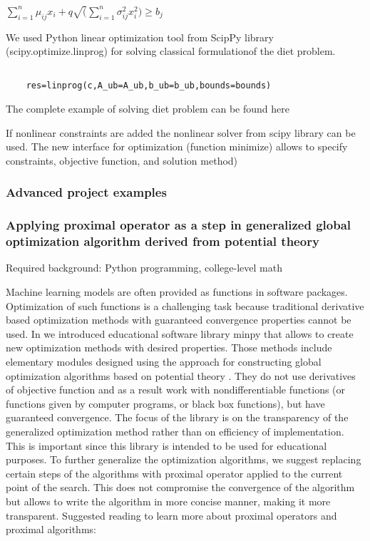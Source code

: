 \documentclass{article} %
\begin{document}
$\sum_{i=1}^{n}{\mu_{ij}x_i}+q \sqrt (\sum_{i=1}^{n}{\sigma_{ij}^2x_i^2}) \ge b_j$ 


We used Python linear optimization tool  from ScipPy library (scipy.optimize.linprog) for solving classical formulationof the diet problem.


\begin{verbatim}

    res=linprog(c,A_ub=A_ub,b_ub=b_ub,bounds=bounds)

\end{verbatim}

The complete example of solving diet problem can be found here \cite{diet}

 If nonlinear constraints are added the nonlinear solver from scipy library can be used. The new interface for optimization (function minimize) allows to specify constraints, objective function, and solution method)

 \subsubsection{Advanced project examples}

  \subsubsection{Applying proximal operator as a step in generalized global optimization algorithm derived from potential theory}


Required background: Python programming, college-level math

Machine learning models are often provided as functions in software packages. Optimization of such functions is a challenging task because traditional derivative based optimization methods with guaranteed convergence properties cannot be used. In \cite{MP} we introduced educational software library minpy that allows to create new optimization methods with desired properties. Those methods include elementary modules designed using the approach for constructing global optimization algorithms based on potential theory \cite{KAP3,KAP2}. They do not use derivatives of objective function and as a result work with nondifferentiable functions (or functions given by computer programs, or black box functions), but have guaranteed convergence. The focus of the library is on the transparency of the generalized optimization method rather than on efficiency of implementation. This is important since this library is intended to be used for educational purposes. To further generalize the optimization algorithms, we suggest replacing certain steps of the algorithms with proximal operator applied to the current point of the search. This does not compromise the convergence of the algorithm  \cite{KAP3}  but allows to write the algorithm in more concise manner, making it more transparent. Suggested reading to learn more about proximal operators and proximal algorithms: \cite{LAKLG,RGMN,SGFLZ}
 
\end{document}
